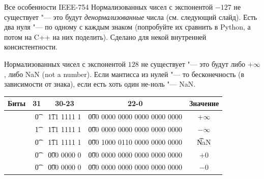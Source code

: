 \begin{frame}{Все особенности IEEE-754}
	Нормализованных чисел с экспонентой $-127$ не существует "--- это будут \textit{денормализованные} числа (см. следующий слайд).
	Есть два нуля "--- по одному с каждым знаком (попробуйте их сравнить в Python, а потом на C++ на них поделить).
	Сделано для некой внутренней консистентности.

	Нормализованных чисел с экспонентой $128$ не существует "--- это будут либо $+\infty$, либо NaN (not a number).
	Если мантисса из нулей "--- то бесконечность (в зависимости от знака), если есть хоть один не-ноль "--- NaN.
	\begin{center}
		\begin{tabular}{|r|c|c|c|c|}
			\hline
			Биты & 31 & 30-23 & 22-0 & Значение \\\hline
			& \t{0} & \t{111 1111 1} & \t{000 0000 0000 0000 0000 0000} & $+\infty $\\\hline
			& \t{1} & \t{111 1111 1} & \t{000 0000 0000 0000 0000 0000} & $-\infty $\\\hline
			& \t{0} & \t{111 1111 1} & \t{000 1000 0110 0000 0000 0000} & \t{NaN} \\\hline
			& \t{0} & \t{000 0000 0} & \t{000 0000 0000 0000 0000 0000} & $+0$ \\\hline
			& \t{0} & \t{000 0000 0} & \t{000 0000 0000 0000 0000 0000} & $-0$ \\\hline
		\end{tabular}
	\end{center}	
\end{frame}
